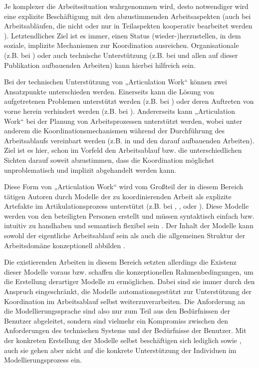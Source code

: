 Je komplexer die Arbeitssituation wahrgenommen wird, desto notwendiger wird eine explizite Beschäftigung mit den abzustimmenden Arbeitsaspekten (auch bei Arbeitsabläufen, die nicht oder nur in Teilaspekten kooperativ bearbeitet werden \citep{Fjuk97}). Letztendliches Ziel ist es immer, einen Status (wieder-)herzustellen, in dem soziale, implizite Mechanismen zur Koordination ausreichen. Organisationale (z.B. bei \citep{Grinter96}) oder auch technische Unterstützung (z.B. bei \citep{Schmidt00} und allen auf dieser Publikation aufbauenden Arbeiten) kann hierbei hilfreich sein.

Bei der technischen Unterstützung von „Articulation Work“ können zwei Ansatzpunkte unterschieden werden. Einerseits kann die Lösung von aufgetretenen Problemen unterstützt werden (z.B. bei \citep{Grinter96}) oder deren Auftreten von vorne herein verhindert werden (z.B. bei \citep{Raposo04}). Andererseits kann „Articulation Work“ bei der Planung von Arbeitsprozessen unterstützt werden, wobei unter anderem die Koordinationsmechanismen während der Durchführung des Arbeitsablaufs vereinbart werden (z.B. in \citep{Sarini02a} und den darauf aufbauenden Arbeiten). Ziel ist es hier, schon im Vorfeld den Arbeitsablauf bzw. die unterschiedlichen Sichten darauf soweit abzustimmen, dass die Koordination möglichst unproblematisch und implizit abgehandelt werden kann.

Diese Form von „Articulation Work“ wird vom Großteil der in diesem Bereich tätigen Autoren durch Modelle der zu koordinierenden Arbeit als explizite Artefakte im Artikulationsprozess unterstützt (z.B. bei \citep{Divitini00}, \citep{Sarini02}, \citep{Raposo04} oder \citep{Jorgensen04}). Diese Modelle werden von den beteiligten Personen erstellt und müssen syntaktisch einfach bzw. intuitiv zu handhaben und semantisch flexibel sein \citep{Herrmann02} \citep{Jorgensen04}. Der Inhalt der Modelle kann sowohl der eigentliche Arbeitsablauf sein \citep{Divitini00} als auch die allgemeinen Struktur der Arbeitsdomäne konzeptionell abbilden \citep{Sarini02}. 

Die \wichtig existierenden Arbeiten in diesem Bereich setzten allerdings die Existenz dieser Modelle voraus bzw. schaffen die konzeptionellen Rahmenbedingungen, um die Erstellung derartiger Modelle zu ermöglichen. Dabei sind sie immer durch den Anspruch eingeschränkt, die Modelle automationsgestützt zur Unterstützung der Koordination im Arbeitsablauf selbst weiterzuverarbeiten. Die Anforderung an die Modellierungssprache sind also nur zum Teil aus den Bedürfnissen der Benutzer abgeleitet, sondern sind vielmehr ein Kompromiss zwischen den Anforderungen des technischen Systems und der Bedürfnisse der Benutzer. Mit der konkreten Erstellung der Modelle selbst beschäftigen sich lediglich \citet{Herrmann02} sowie \citet{Jorgensen04}, auch sie gehen aber nicht auf die konkrete Unterstützung der Individuen im Modellierungsprozess ein.

